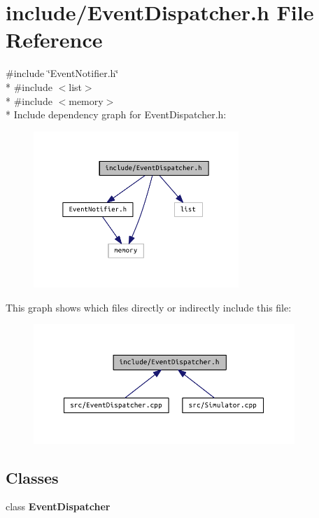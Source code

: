 \section{include/\+Event\+Dispatcher.h File Reference}
\label{_event_dispatcher_8h}
{\ttfamily \#include \char`\"{}Event\+Notifier.\+h\char`\"{}}\\*
{\ttfamily \#include $<$list$>$}\\*
{\ttfamily \#include $<$memory$>$}\\*
Include dependency graph for Event\+Dispatcher.\+h\+:\nopagebreak
\begin{figure}[H]
\begin{center}
\leavevmode
\includegraphics[width=220pt]{_event_dispatcher_8h__incl}
\end{center}
\end{figure}
This graph shows which files directly or indirectly include this file\+:\nopagebreak
\begin{figure}[H]
\begin{center}
\leavevmode
\includegraphics[width=280pt]{_event_dispatcher_8h__dep__incl}
\end{center}
\end{figure}
\subsection*{Classes}
\begin{DoxyCompactItemize}
\item 
class {\bf Event\+Dispatcher}
\end{DoxyCompactItemize}
